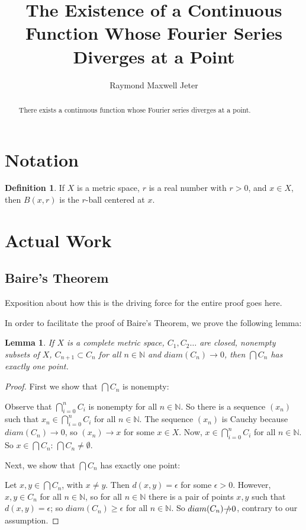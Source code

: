 \documentclass{amsart}
\newcommand{\ep}{\epsilon}
\newcommand{\N}{\mathbb{N}}
\newtheorem{lem}[thm]{Lemma}
\theoremstyle{definition}
\newtheorem{definition}[thm]{Definition}
\begin{document}
\title{The Existence of a Continuous Function Whose Fourier Series Diverges at a Point}
\author{Raymond Maxwell Jeter}

\maketitle

\begin{abstract}
There exists a continuous function whose Fourier series diverges at a point.
\end{abstract}

\section{Notation}

\begin{definition}If $X$ is a metric space, $r$ is a real number with $r>0$, and $x \in X$, then $B(x,r)$ is the $r$-ball centered at $x$.

\end{definition}

\section{Actual Work}

\subsection{Baire's Theorem}

Exposition about how this is the driving force for the entire proof goes here.

In order to facilitate the proof of Baire's Theorem, we prove the following lemma:

\begin{lem}
If $X$ is a complete metric space, $C_1, C_2 \ldots$ are closed, nonempty subsets of $X$, $C_{n+1} \subset C_n$ for all $n \in \N$ and $diam(C_n) \to 0$, then $\bigcap C_n$ has exactly one point.
\end{lem}

\begin{proof}
First we show that $\bigcap C_n$ is nonempty: 

Observe that $\bigcap\limits_{i=0}^n C_i$ is nonempty for all $n \in \N$. 
So there is a sequence $(x_n)$ such that $x_n \in \bigcap\limits_{i=0}^n C_i$ for all $n \in \N$. 
The sequence $(x_n)$ is Cauchy because $diam(C_n) \to 0$, so $(x_n) \to x$ for some $x \in X$.
Now, $x \in \bigcap\limits_{i=0}^n C_i$ for all $n \in \N$.
So $x \in \bigcap C_n$: $\bigcap C_n \neq \emptyset$.

Next, we show that $\bigcap C_n$ has exactly one point:

Let $x, y \in \bigcap C_n$, with $x \neq y$. 
Then $d(x,y) = \ep$ for some $\ep >0$. 
However, $x,y \in C_n$ for all $n \in \N$, so for all $n \in \N$ there is a pair of points $x,y$ such that $d(x,y) = \ep$; 
so $diam(C_n) \geq \ep$ for all $n \in \N$. 
So $diam(C_n) \slashed{\to} 0$, contrary to our assumption.
\end{proof}
\end{document}
